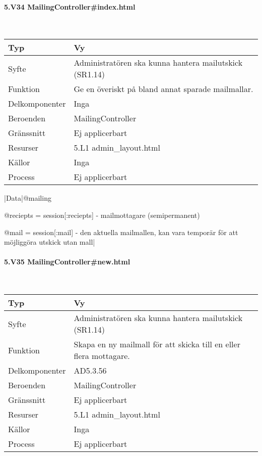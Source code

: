 \documentclass[a4paper, twoside, 11pt, titlepage]{article}
\begin{document}
			\paragraph{5.V34 MailingController\#index.html}\

			\begin {table} [ht] \begin{tabular} {  p{3.5cm} p{9.6cm} }
				\hline
				Typ & Vy  \\
				\hline
				Syfte & Administratören ska kunna hantera mailutskick (SR1.14)  \\
				\hline
				Funktion & Ge en överiskt på bland annat sparade mailmallar.  \\
				\hline
				Delkomponenter & Inga  \\
				\hline
				Beroenden & MailingController  \\
				\hline
				Gränssnitt & Ej applicerbart  \\
				\hline
				Resurser & 5.L1 admin\_layout.html  \\
				\hline
				Källor & Inga  \\
				\hline
				Process & Ej applicerbart  \\
				\hline
			\end{tabular} \end{table} \FloatBarrier
			\vspace{6mm}

			|Data|@mailing

			@reciepts = session[:reciepts] - mailmottagare (semipermanent)

			@mail = session[:mail] - den aktuella mailmallen, kan vara temporär för att möjliggöra utskick utan mall|

			\paragraph{5.V35 MailingController\#new.html}\

			\begin {table} [ht] \begin{tabular} {  p{3.5cm} p{9.6cm} }
				\hline
				Typ & Vy  \\
				\hline
				Syfte & Administratören ska kunna hantera mailutskick (SR1.14)  \\
				\hline
				Funktion & Skapa en ny mailmall för att skicka till en eller flera mottagare.  \\
				\hline
				Delkomponenter & AD5.3.56  \\
				\hline
				Beroenden & MailingController  \\
				\hline
				Gränssnitt & Ej applicerbart  \\
				\hline
				Resurser & 5.L1 admin\_layout.html  \\
				\hline
				Källor & Inga  \\
				\hline
				Process & Ej applicerbart  \\
				\hline
			\end{tabular} \end{table} \FloatBarrier
			\vspace{6mm}
\end{document}
